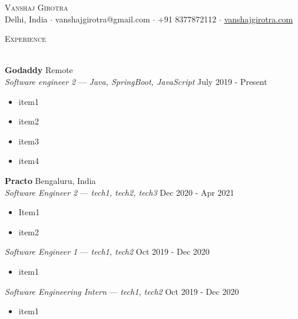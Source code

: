 \documentclass[a4paper]{article}
\newcommand{\lineunder} {
    \vspace*{-8pt} \\
    \hspace*{-18pt} \hrulefill \\
}
\newcommand{\header} [1] {
    {\hspace*{-18pt}\vspace*{6pt} \textsc{#1}}
    \vspace*{-6pt} \lineunder
}
\begin{document}
\vspace*{-40pt}



\vspace*{-10pt}
\begin{center}
    {\Huge \scshape {Vanshaj Girotra}}\\
    Delhi, India $\cdot$ vanshajgirotra@gmail.com $\cdot$ +91 8377872112 $\cdot$  \href{https://www.vanshajgirotra.com}{\underline{vanshajgirotra.com}}\\
\end{center}

\header{Experience}
\vspace{1mm}

\textbf{Godaddy} \hfill Remote\\
\textit{Software engineer 2}  — {\sl Java, SpringBoot, JavaScript}  \hfill July 2019 - Present\\
\vspace{-1mm}
\begin{itemize} \itemsep 1pt
    \item item1
    \item item2
    \item item3
    \item item4
\end{itemize}

\textbf{Practo} \hfill Bengaluru, India \\ 
\textit{Software Engineer 2}  — {\sl tech1, tech2, tech3} \hfill Dec 2020 - Apr 2021\\
\vspace{-1mm}
\begin{itemize} \itemsep 1pt
    \item Item1
    \item item2
\end{itemize}

\textit{Software Engineer 1} — {\sl tech1, tech2} \hfill Oct 2019 - Dec 2020\\
\vspace{-1mm}
\begin{itemize} \itemsep 1pt
\item item1
\end{itemize}


\textit{Software Engineering Intern} — {\sl tech1, tech2} \hfill Oct 2019 - Dec 2020\\
\vspace{-1mm}
\begin{itemize} \itemsep 1pt
\item item1
\end{itemize}
\end{document}
